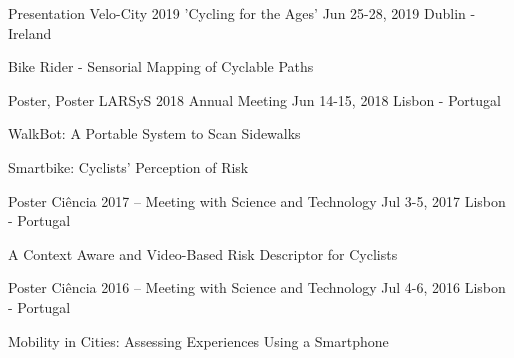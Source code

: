 \begin{cventries}

  \cventryshort
    {Presentation} %
    {Velo-City 2019 'Cycling for the Ages'} %
    {Jun 25-28, 2019} %
    {Dublin - Ireland} %
    {
      \begin{cvitems} %
        \item {Bike Rider - Sensorial Mapping of Cyclable Paths}
      \end{cvitems}
    }


  \cventryshort
    {Poster, Poster} %
    {LARSyS 2018 Annual Meeting} %
    {Jun 14-15, 2018} %
    {Lisbon - Portugal} %
    {
      \begin{cvitems} %
        \item {WalkBot: A Portable System to Scan Sidewalks}
        \item {Smartbike: Cyclists’ Perception of Risk}
      \end{cvitems}
    }


  \cventryshort
    {Poster} %
    {Ciência 2017 – Meeting with Science and Technology} %
    {Jul 3-5, 2017} %
    {Lisbon - Portugal} %
    {
      \begin{cvitems} %
        \item {A Context Aware and Video-Based Risk Descriptor for Cyclists}
      \end{cvitems}
    }


  \cventryshort
    {Poster} %
    {Ciência 2016 – Meeting with Science and Technology} %
    {Jul 4-6, 2016} %
    {Lisbon - Portugal} %
    {
      \begin{cvitems} %
        \item {Mobility in Cities: Assessing Experiences Using a Smartphone}
      \end{cvitems}
    }

  

\end{cventries}
